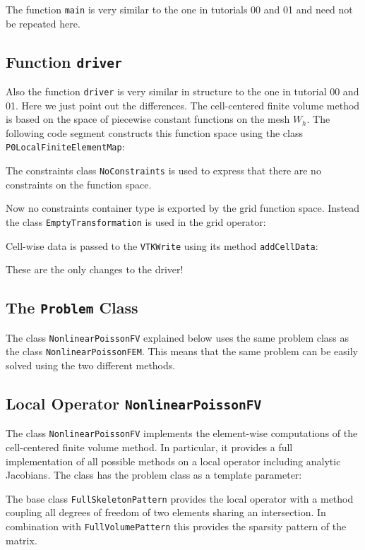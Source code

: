 \documentclass[a4paper,12pt]{article}
\begin{document}
The function \lstinline{main} is very similar to the one in tutorials 00 and 01
and need not be repeated here.

\subsection{Function \lstinline{driver}}

Also the function \lstinline{driver} is very similar in structure to the 
one in tutorial 00 and 01. Here we just point out the differences.
The cell-centered finite volume method is based on the space of piecewise
constant functions on the mesh $W_h$. The following code segment
constructs this function space using the class \lstinline{P0LocalFiniteElementMap}:

The constraints class \lstinline{NoConstraints} is used to express that
there are no constraints on the function space.

Now no constraints container type is exported by the grid function space.
Instead the class \lstinline{EmptyTransformation} is used in the grid operator:


Cell-wise data is passed to the \lstinline{VTKWrite}
using its method \lstinline{addCellData}:

These are the only changes to the driver!

\subsection{The \lstinline{Problem} Class}

The class \lstinline{NonlinearPoissonFV} explained below uses
the same problem class as the class \lstinline{NonlinearPoissonFEM}. This means
that the same problem can be easily solved using the two different methods.

\subsection{Local Operator \lstinline{NonlinearPoissonFV}}

The class \lstinline{NonlinearPoissonFV} implements the
element-wise computations of the cell-centered finite volume
method. In particular, it provides a full implementation
of all possible methods on a local operator including
analytic Jacobians. The class has the problem class as a template parameter:

The base class \lstinline{FullSkeletonPattern} provides the local operator
with a method coupling all degrees of freedom of two elements sharing an intersection.
In combination with \lstinline{FullVolumePattern} this provides the sparsity pattern
of the matrix.
\end{document}

